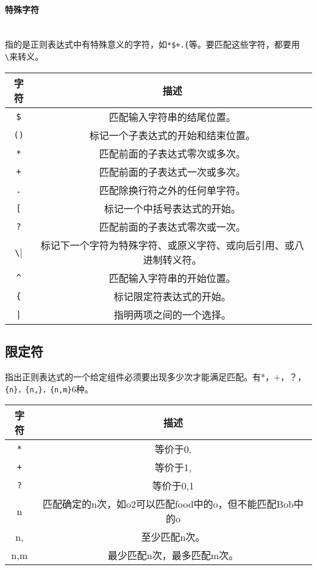 \documentclass{article}
\begin{document}
\begin{large}
  \paragraph{特殊字符}\mbox{} \\
  指的是正则表达式中有特殊意义的字符，如\verb|*$+.{|等。要匹配这些字符，都要用\verb|\|来转义。
    \begin{tabular}{|c|c|}
      \hline
      字符 & 描述 \\
      \hline
      \verb|$| & 匹配输入字符串的结尾位置。\\
      \hline
      \verb|()| & 标记一个子表达式的开始和结束位置。\\
      \hline
      \verb|*| & 匹配前面的子表达式零次或多次。\\
      \hline
      \verb|+| & 匹配前面的子表达式一次或多次。 \\
      \hline
      \verb|.| & 匹配除换行符之外的任何单字符。 \\
      \hline
      \verb|[| & 标记一个中括号表达式的开始。 \\
      \hline
      \verb|?| & 匹配前面的子表达式零次或一次。 \\
      \hline
      \verb|\| & 标记下一个字符为特殊字符、或原义字符、或向后引用、或八进制转义符。 \\
      \hline
      \verb|^| & 匹配输入字符串的开始位置。 \\
      \hline
      \verb|{| & 标记限定符表达式的开始。 \\
      \hline
      \verb'|' & 指明两项之间的一个选择。 \\
      \hline
    \end{tabular}

    \subsection{限定符}
    指出正则表达式的一个给定组件必须要出现多少次才能满足匹配。有*，+，？，\verb|{n}，{n,}，{n,m}|6种。
    \begin{tabular}{|c|c|}
      \hline
      字符 & 描述 \\
      \hline
      \verb|*| & 等价于{0,} \\
      \hline
      \verb|+| & 等价于{1,} \\
      \hline
      \verb|?| & 等价于{0,1} \\
      \hline
      {n} & 匹配确定的n次，如o{2}可以匹配food中的o，但不能匹配Bob中的o \\
      \hline
      {n,} & 至少匹配n次。\\
      \hline
      {n,m} & 最少匹配n次，最多匹配m次。\\
      \hline
    \end{tabular}


\end{large}
\end{document}
